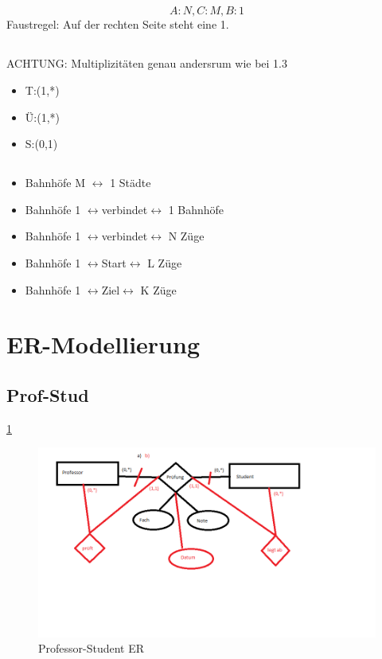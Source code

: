 \subsection{}
\begin{displaymath}
	A:N, C:M, B:1
\end{displaymath}
Faustregel: Auf der rechten Seite steht eine 1.
\subsection{}
ACHTUNG: Multiplizitäten genau andersrum wie bei 1.3
\begin{itemize}
	\item T:(1,*)
	\item Ü:(1,*)
	\item S:(0,1)
\end{itemize}
\subsection{}
\begin{itemize}
	\item Bahnhöfe M \(\leftrightarrow\) 1 Städte
	\item Bahnhöfe 1 \(\leftrightarrow\)verbindet\(\leftrightarrow\) 1 Bahnhöfe
	\item Bahnhöfe 1 \(\leftrightarrow\)verbindet\(\leftrightarrow\) N Züge
	\item Bahnhöfe 1 \(\leftrightarrow\)Start\(\leftrightarrow\) L Züge
	\item Bahnhöfe 1 \(\leftrightarrow\)Ziel\(\leftrightarrow\) K Züge
\end{itemize}

\section{ER-Modellierung}
\subsection{Prof-Stud}
\ref{img:Prof-Stud-ER}
\begin{figure}
	\includegraphics[width = 16cm]{./Database/Images/2_1.png}
	\caption{Professor-Student ER}
	\label{img:Prof-Stud-ER}
\end{figure}

